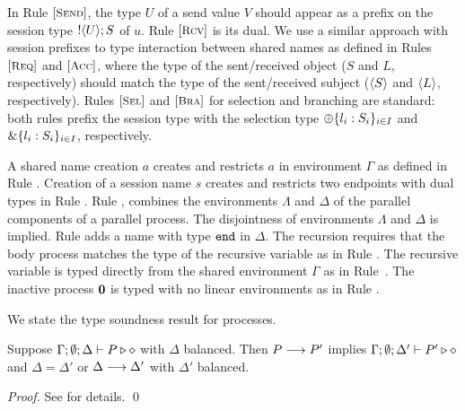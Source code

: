 In Rule ${\footnotesize[\textrm{\small \textsc{Send}}]}$, 
the type $U$ of a send value $V$ should appear as a prefix
on the session type $! \langle U \rangle ; S$ of $u$.
Rule ${\footnotesize[\textrm{\small \textsc{Rcv}}]}$ is its dual.  
We use a similar approach with session prefixes
to type interaction between shared names as defined 
in Rules ${\footnotesize[\textrm{\small \textsc{Req}}]}$ and ${\footnotesize[\textrm{\small \textsc{Acc}}]}$,
where the type of the sent/received object 
($S$ and $L$, respectively) should
match the type of the sent/received subject
($\langle S \rangle$ and $\langle L \rangle$, respectively).
Rules 
${\footnotesize[\textrm{\small \textsc{Sel}}]}$ and ${\footnotesize[\textrm{\small \textsc{Bra}}]}$ for selection and branching are standard: 
both
rules prefix the session type with the selection
type $\oplus \{l_i: S_i\}_{i \in I}$ and
$\& \{l_i:S_i\}_{i \in I}$, respectively.

A
shared name creation $a$ creates and restricts
$a$ in environment $\Gamma$ as defined in 
Rule . 
Creation of a session name $s$
creates and restricts two endpoints with dual types 
in Rule . 
Rule , 
combines the environments
$\Lambda$ and $\Delta$ of
the parallel components of a parallel process.
The disjointness of environments $\Lambda$ and $\Delta$
is implied. Rule  adds 
a name with type $\mathtt{end}$ in $\Delta$.  
The recursion requires that the body process 
matches the type of the recursive
variable as in Rule .
The recursive variable is typed
directly from the shared environment $\Gamma$ as
in Rule~.
The inactive process $\mathbf{0}$ is typed with no linear environments as in Rule . 


We state the type soundness result for \HOp processes.



\begin{theorem}\label{t:sr}%
			Suppose $\Gamma; \emptyset; \Delta \vdash P \triangleright \diamond$
			with
			$\Delta$ balanced. 
			Then $P \longrightarrow P'$ implies $\Gamma; \emptyset; \Delta'  \vdash P' \triangleright \diamond$
			and $\Delta = \Delta'$ or $\Delta \longrightarrow \Delta'$
			with $\Delta'$ balanced. 
\end{theorem}
\begin{proof}
See  for details. \qed %
\end{proof}

